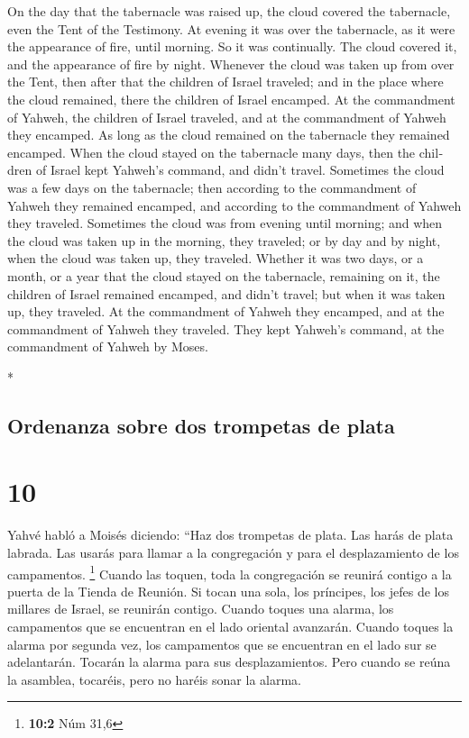 \begin{paracol}{2}
\begin{otherlanguage}{english}
 On the day that the tabernacle was raised up, the cloud
covered the tabernacle, even the Tent of the Testimony. At evening it
was over the tabernacle, as it were the appearance of fire, until
morning.  So it was continually. The cloud covered it,
and the appearance of fire by night.  Whenever the cloud
was taken up from over the Tent, then after that the children of Israel
traveled; and in the place where the cloud remained, there the children
of Israel encamped.  At the commandment of Yahweh, the
children of Israel traveled, and at the commandment of Yahweh they
encamped. As long as the cloud remained on the tabernacle they remained
encamped.  When the cloud stayed on the tabernacle many
days, then the children of Israel kept Yahweh's command, and didn't
travel.  Sometimes the cloud was a few days on the
tabernacle; then according to the commandment of Yahweh they remained
encamped, and according to the commandment of Yahweh they traveled.
 Sometimes the cloud was from evening until morning; and
when the cloud was taken up in the morning, they traveled; or by day and
by night, when the cloud was taken up, they traveled. 
Whether it was two days, or a month, or a year that the cloud stayed on
the tabernacle, remaining on it, the children of Israel remained
encamped, and didn't travel; but when it was taken up, they traveled.
 At the commandment of Yahweh they encamped, and at the
commandment of Yahweh they traveled. They kept Yahweh's command, at the
commandment of Yahweh by Moses.

\end{otherlanguage}

\switchcolumn[0]*

\hypertarget{ordenanza-sobre-dos-trompetas-de-plata}{%
\subsection{Ordenanza sobre dos trompetas de
plata}\label{ordenanza-sobre-dos-trompetas-de-plata}}

\hypertarget{section-18}{%
\section{10}\label{section-18}}

 Yahvé habló a Moisés diciendo:  ``Haz dos
trompetas de plata. Las harás de plata labrada. Las usarás para llamar a
la congregación y para el desplazamiento de los campamentos. \footnote{\textbf{10:2}
  Núm 31,6}  Cuando las toquen, toda la congregación se
reunirá contigo a la puerta de la Tienda de Reunión.  Si
tocan una sola, los príncipes, los jefes de los millares de Israel, se
reunirán contigo.  Cuando toques una alarma, los
campamentos que se encuentran en el lado oriental avanzarán.
 Cuando toques la alarma por segunda vez, los campamentos
que se encuentran en el lado sur se adelantarán. Tocarán la alarma para
sus desplazamientos.  Pero cuando se reúna la asamblea,
tocaréis, pero no haréis sonar la alarma.


\end{paracol}
